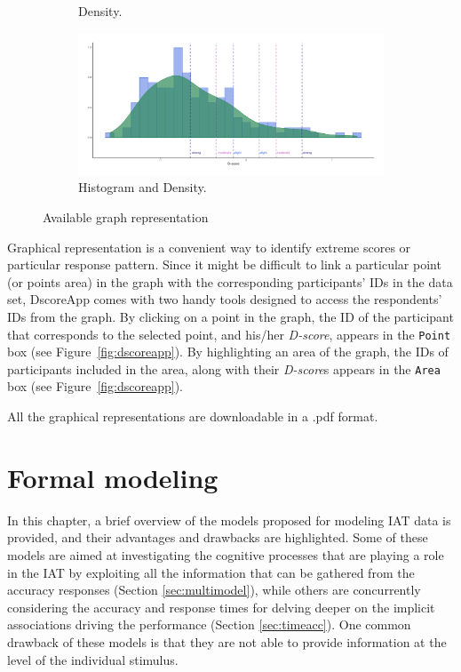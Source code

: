 \documentclass[12pt]{book}
\begin{document}
\begin{figure}[h!]
\begin{subfigure}{0.4\linewidth}
		\caption{Density.}
		\label{fig:dens}
	\end{subfigure}
	\begin{subfigure}{0.4\linewidth}
		\includegraphics[width=\linewidth]{HistDensDscore3.pdf}
		\caption{Histogram and Density.}
		\label{fig:histdens}
	\end{subfigure}
	\caption{\label{fig:dscoregraph} Available graph representation}
\end{figure}

Graphical representation is a convenient way to identify extreme scores or particular response pattern. Since it might be difficult to link a particular point (or points area) in the graph with the corresponding participants' IDs in the data set, DscoreApp comes with two handy tools designed to access the respondents' IDs from the graph. By clicking on a point in the graph, the ID of the participant that corresponds to the selected point, and his/her \emph{D-score}, appears in the \texttt{Point} box (see Figure~\ref{fig:dscoreapp}). By highlighting an area of the graph, the IDs of participants included in the area, along with their \emph{D-score}s appears in the \texttt{Area} box (see Figure~\ref{fig:dscoreapp}).  

All the graphical representations are downloadable in a .pdf format.

\chapter{Formal modeling}

In this chapter, a brief overview of the models proposed for modeling IAT data is provided, and their advantages and drawbacks are highlighted. 
Some of these models are aimed at investigating the cognitive processes that are playing a role in the IAT by exploiting all the information that can be gathered from the accuracy responses (Section \ref{sec:multimodel}), while others are concurrently considering the accuracy and response times for delving deeper on the implicit associations driving the performance (Section \ref{sec:timeacc}). One common drawback of these models is that they are not able to provide information at the level of the individual stimulus.
\end{document}
